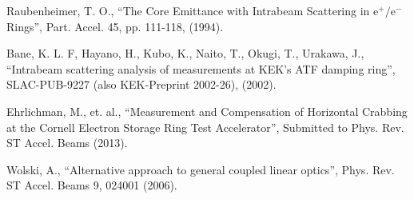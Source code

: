 \documentclass[11pt]{article}
\begin{document}
\begin{thebibliography}{9}
Raubenheimer, T. O., ``The Core Emittance with Intrabeam Scattering in e$^+/$e$^-$ Rings'',
Part. Accel. 45, pp. 111-118, (1994).

Bane, K. L. F, Hayano, H., Kubo, K., Naito, T., Okugi, T., Urakawa, J.,
``Intrabeam scattering analysis of measurements at KEK's ATF damping ring'',
SLAC-PUB-9227 (also KEK-Preprint 2002-26), (2002).

Ehrlichman, M., et. al., ``Measurement and Compensation of Horizontal Crabbing at the
Cornell Electron Storage Ring Test Accelerator'',
Submitted to Phys. Rev. ST Accel. Beams (2013).

Wolski, A., ``Alternative approach to general coupled linear optics'', 
Phys. Rev. ST Accel. Beams 9, 024001 (2006).



\end{thebibliography}
\end{document}
